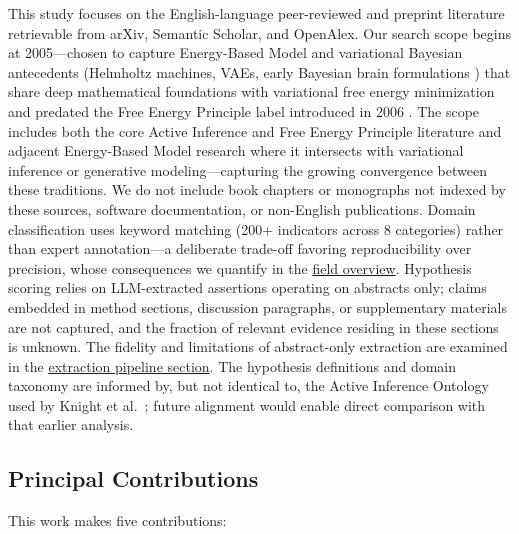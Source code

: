 \documentclass[
  english,
]{article}
\begin{document}
This study focuses on the English-language peer-reviewed and preprint
literature retrievable from arXiv, Semantic Scholar, and OpenAlex. Our
search scope begins at 2005---chosen to capture Energy-Based Model and
variational Bayesian antecedents (Helmholtz machines, VAEs, early
Bayesian brain formulations
\citep{dayan1995helmholtz, lecun2006tutorial}) that share deep
mathematical foundations with variational free energy minimization and
predated the Free Energy Principle label introduced in 2006
\citep{friston2006free}. The scope includes both the core Active
Inference and Free Energy Principle literature and adjacent Energy-Based
Model research where it intersects with variational inference or
generative modeling---capturing the growing convergence between these
traditions. We do not include book chapters or monographs not indexed by
these sources, software documentation, or non-English publications.
Domain classification uses keyword matching (200+ indicators across 8
categories) rather than expert annotation---a deliberate trade-off
favoring reproducibility over precision, whose consequences we quantify
in the \hyperref[sec:field_overview]{field overview}. Hypothesis scoring
relies on LLM-extracted assertions operating on abstracts only; claims
embedded in method sections, discussion paragraphs, or supplementary
materials are not captured, and the fraction of relevant evidence
residing in these sections is unknown. The fidelity and limitations of
abstract-only extraction are examined in the
\hyperref[sec:extraction_pipeline]{extraction pipeline section}. The
hypothesis definitions and domain taxonomy are informed by, but not
identical to, the Active Inference Ontology used by Knight et
al.~\citep{knight2022fep}; future alignment would enable direct
comparison with that earlier analysis.

\subsection{Principal Contributions}\label{principal-contributions}

This work makes five contributions:
\end{document}
